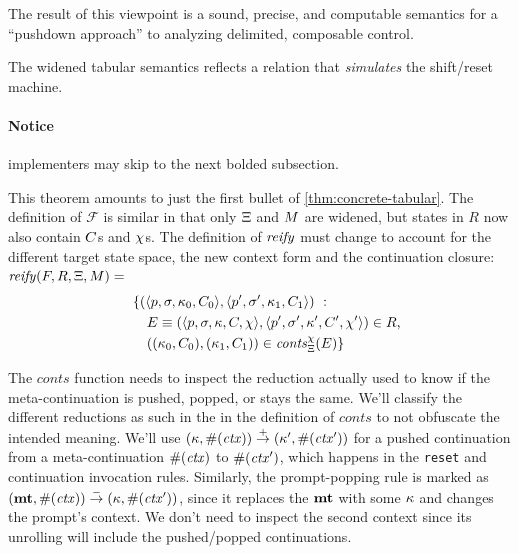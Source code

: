 The result of this viewpoint is a sound, precise, and computable semantics for a ``pushdown approach'' to analyzing delimited, composable control.

\begin{theorem}\label{thm:sound-sr}
  The widened tabular semantics reflects a relation that \emph{simulates} the shift/reset machine.
\end{theorem}

\paragraph{Notice} implementers may skip to the next bolded subsection.

This theorem amounts to just the first bullet of \autoref{thm:concrete-tabular}.
%
The definition of ${\mathcal F}$ is similar in that only $\Xi$ and $M$ are widened, but states in $R$ now also contain $C$s and $\chi$s.
%
The definition of $\mathit{reify}$ must change to account for the different target state space, the new context form and the continuation closure:
\\

  $\mathit{reify}(F, R, \Xi, M) =$
\begin{align*}
  &\quad \{ (\tpl{\mpoint,\mstore,\mkont_0,\mmkont_0},
              \tpl{\mpoint',\mstore',\mkont_1,\mmkont_1})\ :\ 
\\ &\qquad E\equiv(\tpl{\mpoint,\mstore,\mkont,\mmkont,\mmktab}, \tpl{\mpoint',\mstore',\mkont',\mmkont',\mmktab'}) \in R\text,
\\ &\qquad((\mkont_0,\mmkont_0),(\mkont_1,\mmkont_1)) \in \mathit{conts}_\mktab^\mmktab(E) \}
\end{align*}

The $\mathit{conts}$ function needs to inspect the reduction actually used to know if the meta-continuation is pushed, popped, or stays the same.
%
We'll classify the different reductions as such in the in the definition of $\mathit{conts}$ to not obfuscate the intended meaning.
%
We'll use $(\kappa,\#(\mathit{ctx})) \overset{+}{\to} (\kappa',\#(\mathit{ctx}'))$ for a pushed continuation from a meta-continuation $\#(\mathit{ctx})$ to $\#(\mathit{ctx}')$, which happens in the \texttt{reset} and continuation invocation rules.
%
Similarly, the prompt-popping rule is marked as $(\mathbf{mt},\#(\mathit{ctx})) \overset{-}{\to} (\kappa,\#(\mathit{ctx}'))$, since it replaces the $\mathbf{mt}$ with some $\kappa$ and changes the prompt's context.
%
We don't need to inspect the second context since its unrolling will include the pushed/popped continuations.

